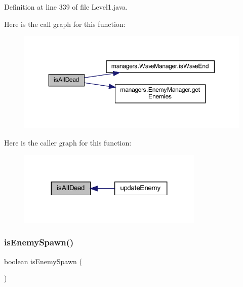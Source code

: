 Definition at line 339 of file Level1.\+java.

Here is the call graph for this function\+:\nopagebreak
\begin{figure}[H]
\begin{center}
\leavevmode
\includegraphics[width=350pt]{classscenes_1_1_level1_acd1846d50c3d8678777f9ab6716f5cf3_cgraph}
\end{center}
\end{figure}
Here is the caller graph for this function\+:\nopagebreak
\begin{figure}[H]
\begin{center}
\leavevmode
\includegraphics[width=251pt]{classscenes_1_1_level1_acd1846d50c3d8678777f9ab6716f5cf3_icgraph}
\end{center}
\end{figure}
\mbox{\label{classscenes_1_1_level1_a121827ebd1c5b24c92f966721b51c0b9}} 
\subsubsection{\texorpdfstring{is\+Enemy\+Spawn()}{isEnemySpawn()}}
{\footnotesize\ttfamily boolean is\+Enemy\+Spawn (\begin{DoxyParamCaption}{ }\end{DoxyParamCaption})\hspace{0.3cm}{\ttfamily [private]}}



